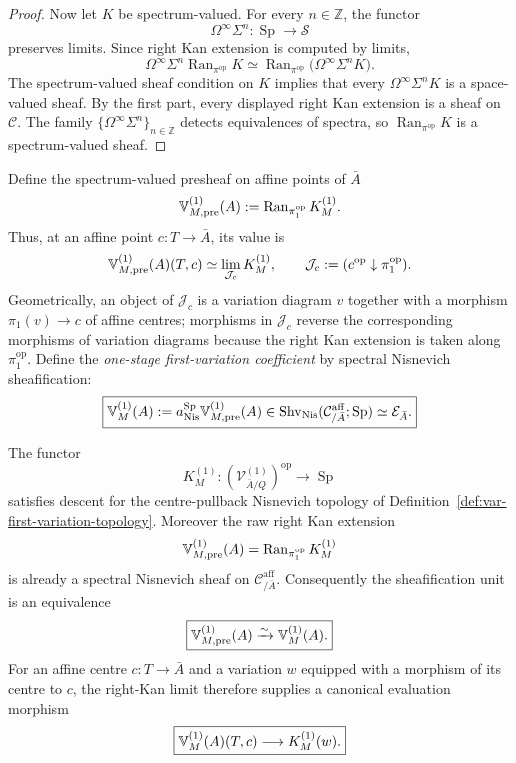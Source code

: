 \begin{proof}
Now let \(K\) be spectrum-valued. For every \(n\in\mathbb Z\), the functor
\[
    \Omega^\infty\Sigma^n:\operatorname{Sp}\to\mathcal S
\]
preserves limits. Since right Kan extension is computed by limits,
\[
    \Omega^\infty\Sigma^n
    \operatorname{Ran}_{\pi^{\mathrm{op}}}K
    \simeq
    \operatorname{Ran}_{\pi^{\mathrm{op}}}
    \bigl(\Omega^\infty\Sigma^nK\bigr).
\]
The spectrum-valued sheaf condition on \(K\) implies that every \(\Omega^\infty\Sigma^nK\) is a space-valued sheaf. By the first part, every displayed right Kan extension is a sheaf on \(\mathcal C\). The family \(\{\Omega^\infty\Sigma^n\}_{n\in\mathbb Z}\) detects equivalences of spectra, so \(\operatorname{Ran}_{\pi^{\mathrm{op}}}K\) is a spectrum-valued sheaf.
\end{proof}

\begin{definition}
\label{def:var-first-coeff-functor}
Define the spectrum-valued presheaf on affine points of \(\bar A\)
\[
    \mathbb V^{(1)}_{M,\mathrm{pre}}(A)
    :=
    \operatorname{Ran}_{\pi_1^{\mathrm{op}}}K_M^{(1)}.
\]
Thus, at an affine point \(c:T\to\bar A\), its value is
\[
    \mathbb V^{(1)}_{M,\mathrm{pre}}(A)(T,c)
    \simeq
    \lim_{\mathcal J_c}K_M^{(1)},
    \qquad
    \mathcal J_c:=(c^{\mathrm{op}}\downarrow\pi_1^{\mathrm{op}}).
\]
Geometrically, an object of \(\mathcal J_c\) is a variation diagram \(v\) together with a morphism \(\pi_1(v)\to c\) of affine centres; morphisms in \(\mathcal J_c\) reverse the corresponding morphisms of variation diagrams because the right Kan extension is taken along \(\pi_1^{\mathrm{op}}\). Define the \emph{one-stage first-variation coefficient} by spectral Nisnevich sheafification:
\[
    \boxed{
    \mathbb V^{(1)}_M(A)
    :=
    a_{\mathrm{Nis}}^{\operatorname{Sp}}
    \mathbb V^{(1)}_{M,\mathrm{pre}}(A)
    \in
    \operatorname{Shv}_{\mathrm{Nis}}
    (\mathcal C^{\mathrm{aff}}_{/\bar A};\operatorname{Sp})
    \simeq
    \mathcal E_{\bar A}.
    }
\]
\end{definition}

\begin{theorem}
\label{thm:var-first-kan-sheaf}
The functor
\[
    K_M^{(1)}:
    (\mathcal V^{(1)}_{\bar A/Q})^{\mathrm{op}}
    \longrightarrow
    \operatorname{Sp}
\]
satisfies descent for the centre-pullback Nisnevich topology of Definition~\ref{def:var-first-variation-topology}. Moreover the raw right Kan extension
\[
    \mathbb V^{(1)}_{M,\mathrm{pre}}(A)
    =
    \operatorname{Ran}_{\pi_1^{\mathrm{op}}}K_M^{(1)}
\]
is already a spectral Nisnevich sheaf on
\(\mathcal C^{\mathrm{aff}}_{/\bar A}\). Consequently the sheafification unit is an equivalence
\[
    \boxed{
    \mathbb V^{(1)}_{M,\mathrm{pre}}(A)
    \xrightarrow{\sim}
    \mathbb V^{(1)}_M(A).
    }
\]
For an affine centre \(c:T\to\bar A\) and a variation \(w\) equipped with a morphism of its centre to \(c\), the right-Kan limit therefore supplies a canonical evaluation morphism
\[
    \boxed{
    \mathbb V^{(1)}_M(A)(T,c)
    \longrightarrow
    K_M^{(1)}(w).
    }
\]
\end{theorem}


